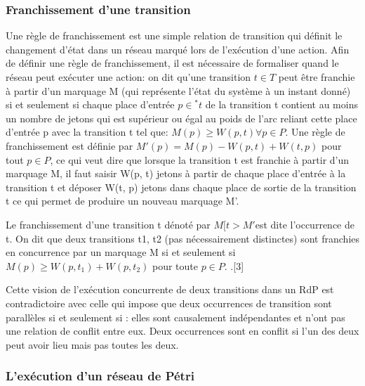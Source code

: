 \subsubsection{ Franchissement d’une transition }
Une règle de franchissement est une simple relation de transition qui définit le changement d'état dans un réseau marqué lors de l'exécution d'une action. Afin de définir une règle de franchissement, il est nécessaire de formaliser quand le réseau peut exécuter une action:  on  dit  qu'une  transition $t \in T$ peut  être  franchie  à  partir  d'un  marquage  M  (qui représente l'état du système à un instant donné) si et seulement si chaque place d'entrée $p  \in$$^{*}t$ de la transition t contient au moins un nombre de jetons qui est supérieur ou égal au poids de l'arc reliant cette place d'entrée p avec la transition t  tel que:   $M(p)   \geq W(p, t)  \forall p \in P$. Une règle de franchissement est définie par $M'(p) = M (p) - W(p, t) + W(t, p)$ pour  tout $p \in P$, ce qui veut dire que lorsque la transition t est franchie à partir d'un marquage M, il faut saisir  W(p, t) jetons à partir de chaque place d'entrée à la transition t et déposer W(t, p) jetons dans chaque place de sortie de la transition t ce qui permet de produire un nouveau marquage M'. 

Le franchissement d'une transition t dénoté par $M[t > M' $est dite l'occurrence de t. On  dit que deux transitions t1, t2  (pas nécessairement distinctes) sont franchies en concurrence par un marquage M  si et seulement si $ M (p) \geq W(p, t_{1}) + W(p, t_{2})$ pour toute $p \in P$. .[3] 

Cette vision de l'exécution concurrente de deux transitions dans un RdP est contradictoire avec celle qui impose que deux occurrences de transition sont parallèles si et seulement si : elles sont causalement indépendantes et n'ont pas une relation de conflit entre eux. Deux occurrences sont en conflit si l'un des deux peut avoir lieu mais pas toutes les deux.


\subsubsection{L'exécution d'un réseau de Pétri }

